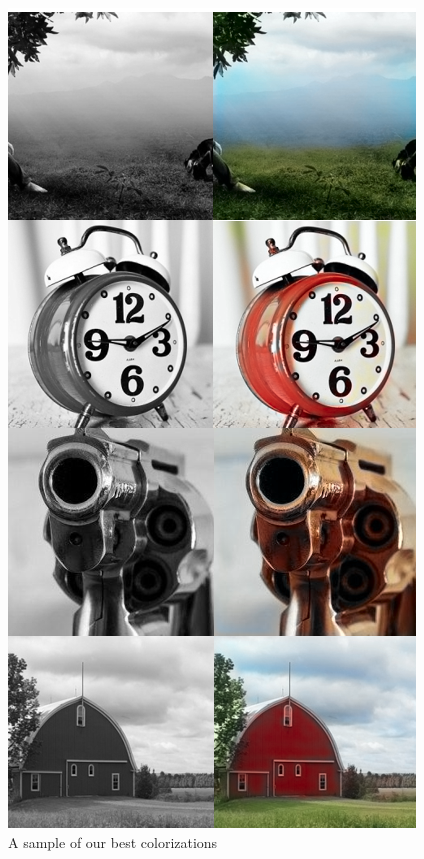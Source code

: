 \documentclass[twoside,twocolumn]{article}
\begin{document}
\begin{figure}
	\includegraphics[width=\linewidth]{img/bestimgs.png}
	\caption{A sample of our best colorizations}
	\label{fig:bestimgs}
\end{figure}
\end{document}
